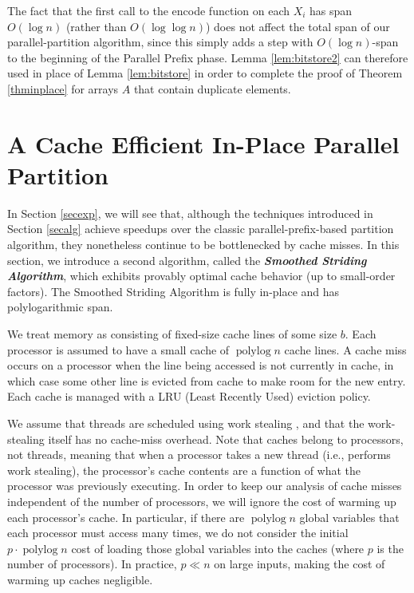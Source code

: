 \documentclass[sigplan, 10pt, nonacm]{acmart}
\newcommand{\polylog}{\operatorname{polylog}}
\newcommand{\defn}[1]{{\textit{\textbf{\boldmath #1}}}}
\renewcommand{\paragraph}[1]{\vspace{0.09in}\noindent{\bf \boldmath #1.}}
\theoremstyle{remark}
\theoremstyle{remark}
\begin{document}
The fact that the first call to the encode function on each $X_i$ has
span $O(\log n)$ (rather than $O(\log \log n)$) does not affect the
total span of our parallel-partition algorithm, since this simply adds
a step with $O(\log n)$-span to the beginning of the Parallel Prefix
phase. Lemma \ref{lem:bitstore2} can therefore used in place of Lemma
\ref{lem:bitstore} in order to complete the proof of Theorem
\ref{thminplace} for arrays $A$ that contain duplicate elements.


\section{A Cache Efficient In-Place Parallel Partition}\label{sec:smoothing}

In Section \ref{secexp}, we will see that, although the techniques
introduced in Section \ref{secalg} achieve speedups over the classic
parallel-prefix-based partition algorithm, they nonetheless continue
to be bottlenecked by cache misses. In this section, we introduce a
second algorithm, called the \defn{Smoothed Striding Algorithm}, which
exhibits provably optimal cache behavior (up to small-order
factors). The Smoothed Striding Algorithm is fully in-place and has
polylogarithmic span.



\paragraph{Modeling Cache Misses}
We treat memory as consisting of fixed-size cache lines of some
size $b$. Each processor is assumed to have a small cache of
$\operatorname{polylog}{n}$ cache lines.  A cache miss occurs on a
processor when the line being accessed is not currently in cache, in
which case some other line is evicted from cache to make room for the
new entry.  Each cache is managed with a LRU (Least Recently Used)
eviction policy.

We assume that threads are scheduled using work stealing \cite{??},
and that the work-stealing itself has no cache-miss overhead. Note
that caches belong to processors, not threads, meaning that when a
processor takes a new thread (i.e., performs work stealing), the
processor's cache contents are a function of what the processor was
previously executing. In order to keep our analysis of cache misses
independent of the number of processors, we will ignore the cost of
warming up each processor's cache. In particular, if there are
$\polylog n$ global variables that each processor must access many
times, we do not consider the initial $p \cdot \polylog n$ cost of
loading those global variables into the caches (where $p$ is the
number of processors). In practice, $p \ll n$ on large inputs, making
the cost of warming up caches negligible.
\end{document}
